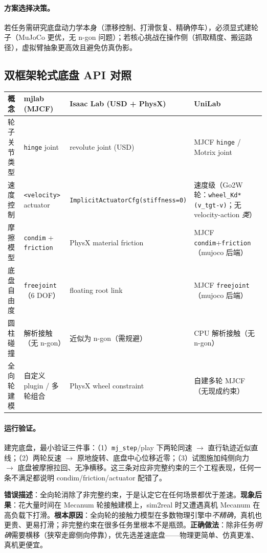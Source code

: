 \paragraph{方案选择决策。}若任务需研究底盘动力学本身（漂移控制、打滑恢复、精确停车），必须显式建轮子（MuJoCo 更优，无 n-gon 问题）；若核心挑战在操作侧（抓取精度、搬运路径），虚拟臂抽象更高效且避免仿真伪影。

\subsection{双框架轮式底盘 API 对照}
\label{sec:rlmc-wh-base-api}

\begin{center}
\small
\begin{tabular}{@{}llll@{}}
\toprule
概念 & mjlab (MJCF) & Isaac Lab (USD + PhysX) & UniLab \\
\midrule
轮子关节类型 & \verb|hinge| joint & revolute joint (USD) & MJCF \verb|hinge| / Motrix joint \\
速度控制 & \verb|<velocity>| actuator & \verb|ImplicitActuatorCfg(stiffness=0)| & 速度级（Go2W 轮：\verb|wheel_Kd*(v_tgt-v)|；无 velocity-action \emph{类}） \\
摩擦模型 & \verb|condim| + \verb|friction| & PhysX material friction & MJCF \verb|condim|+\verb|friction|（mujoco 后端） \\
底盘自由度 & \verb|freejoint|（6 DOF） & floating root link & MJCF \verb|freejoint|（mujoco 后端） \\
圆柱碰撞 & 解析接触（无 n-gon） & 近似为 n-gon（需规避） & CPU 解析接触（无 n-gon） \\
全向轮建模 & 自定义 plugin / 多轮组合 & PhysX wheel constraint & 自建多轮 MJCF（无现成约束） \\
\bottomrule
\end{tabular}
\end{center}

\paragraph{运行验证。}建完底盘，最小验证三件事：（1）\verb|mj_step|/play 下两轮同速 $\to$ 直行轨迹近似直线；（2）两轮反速 $\to$ 原地旋转、底盘中心位移近零；（3）试图施加纯侧向力 $\to$ 底盘被摩擦拉回、无净横移。这三条对应非完整约束的三个工程表现，任何一条不满足都说明 condim/friction/actuator 配错了。

\begin{pitfall}
\textbf{错误描述}：全向轮消除了非完整约束，于是认定它在任何场景都优于差速。\textbf{现象后果}：花大量时间在 Mecanum 轮接触建模上，sim2real 时又遭遇真机 Mecanum 在高负载下打滑。\textbf{根本原因}：全向轮的接触力模型在多数物理引擎中\emph{不精确}，真机也更贵、更易打滑；非完整约束在很多任务里根本不是瓶颈。\textbf{正确做法}：除非任务\emph{明确}需要横移（狭窄走廊侧向停靠），优先选差速底盘——物理更简单、仿真更准、真机更便宜。
\end{pitfall}

